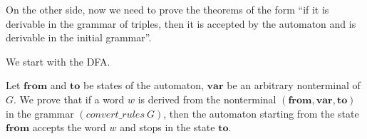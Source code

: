 %
%

On the other side, now we need to prove the theorems of the form  ``if it is derivable in the grammar of triples, then it is accepted by the automaton and is derivable in the initial grammar''.

We start with the DFA.

\begin{theorem}
	Let $ \boldsymbol{from} $ and $ \boldsymbol{to} $ be states of the automaton, $ \boldsymbol{var} $ be an arbitrary nonterminal of $G$. We prove that if a word $w$ is derived from the nonterminal $ (\boldsymbol{from}, \boldsymbol{var}, \boldsymbol{to}) $ in the grammar $ (convert\_rules ~ G) $, then the automaton starting from the state $ \boldsymbol{from} $ accepts the word $w$ and stops in the state $ \boldsymbol{to} $.	
\end{theorem}

